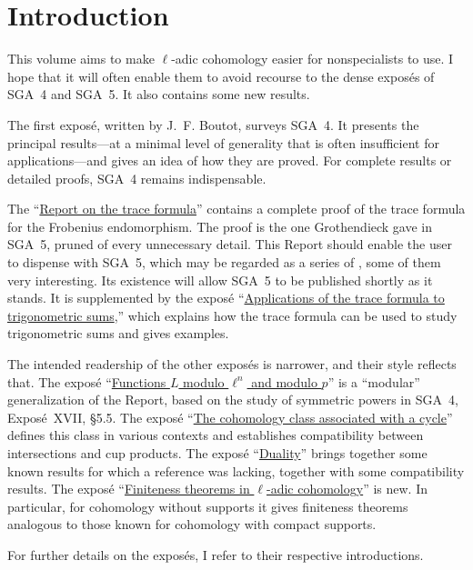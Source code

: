 

\chapter*{Introduction}

This volume aims to make $\ell$-adic cohomology easier for nonspecialists to
use. I hope that it will often enable them to avoid recourse to the dense
expos\'es of SGA~4 and SGA~5. It also contains some new results.

The first expos\'e, written by J.~F. Boutot, surveys SGA~4. It presents the
principal results---at a minimal level of generality that is often
insufficient for applications---and gives an idea of how they are proved. For
complete results or detailed proofs, SGA~4 remains indispensable.

The ``\hyperref[II]{Report on the trace formula}'' contains a complete proof of the trace formula for the
Frobenius endomorphism. The proof is the one Grothendieck gave in SGA~5,
pruned of every unnecessary detail. This Report should enable the user to
dispense with SGA~5, which may be regarded as a series of , some of
them very interesting. Its existence will allow SGA~5 to be published shortly
as it stands. It is supplemented by the expos\'e ``\hyperref[VI]{Applications of the trace formula to trigonometric sums},'' which
explains how the trace formula can be used to study trigonometric sums and
gives examples.

The intended readership of the other expos\'es is narrower, and their style
reflects that. The expos\'e ``\hyperref[III]{Functions $L$ modulo $\ell^n$ and modulo $p$}'' is a ``modular'' generalization
of the Report, based on the study of symmetric powers in SGA~4, Expos\'e~XVII,
\S5.5. The expos\'e ``\hyperref[IV]{The cohomology class associated with a cycle}'' defines this class in various contexts
and establishes compatibility between intersections and cup products. The
expos\'e ``\hyperref[V]{Duality}'' brings together some known results for which a
reference was lacking, together with some compatibility results. The expos\'e
``\hyperref[VII]{Finiteness theorems in $\ell$-adic cohomology}'' is new. In particular, for cohomology without supports it
gives finiteness theorems analogous to those known for cohomology with compact
supports.

For further details on the expos\'es, I refer to their respective
introductions.

